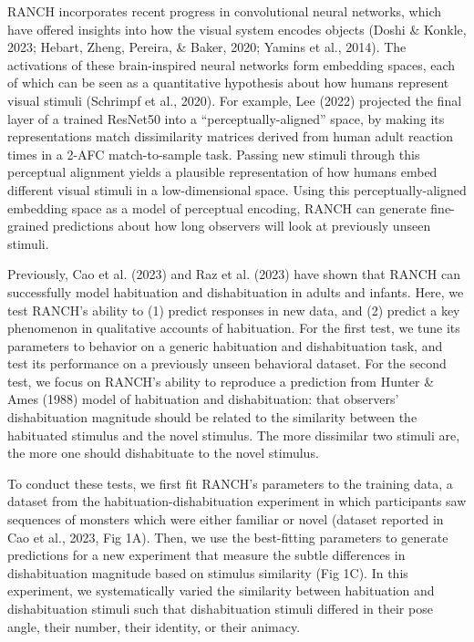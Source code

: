 \documentclass[10pt, letterpaper]{article}
\begin{document}
RANCH incorporates recent progress in convolutional neural networks,
which have offered insights into how the visual system encodes objects
(Doshi \& Konkle, 2023; Hebart, Zheng, Pereira, \& Baker, 2020; Yamins
et al., 2014). The activations of these brain-inspired neural networks
form embedding spaces, each of which can be seen as a quantitative
hypothesis about how humans represent visual stimuli (Schrimpf et al.,
2020). For example, Lee (2022) projected the final layer of a trained
ResNet50 into a ``perceptually-aligned'' space, by making its
representations match dissimilarity matrices derived from human adult
reaction times in a 2-AFC match-to-sample task. Passing new stimuli
through this perceptual alignment yields a plausible representation of
how humans embed different visual stimuli in a low-dimensional space.
Using this perceptually-aligned embedding space as a model of perceptual
encoding, RANCH can generate fine-grained predictions about how long
observers will look at previously unseen stimuli.

Previously, Cao et al. (2023) and Raz et al. (2023) have shown that
RANCH can successfully model habituation and dishabituation in adults
and infants. Here, we test RANCH's ability to (1) predict responses in
new data, and (2) predict a key phenomenon in qualitative accounts of
habituation. For the first test, we tune its parameters to behavior on a
generic habituation and dishabituation task, and test its performance on
a previously unseen behavioral dataset. For the second test, we focus on
RANCH's ability to reproduce a prediction from Hunter \& Ames (1988)
model of habituation and dishabituation: that observers' dishabituation
magnitude should be related to the similarity between the habituated
stimulus and the novel stimulus. The more dissimilar two stimuli are,
the more one should dishabituate to the novel stimulus.

To conduct these tests, we first fit RANCH's parameters to the training
data, a dataset from the habituation-dishabituation experiment in which
participants saw sequences of monsters which were either familiar or
novel (dataset reported in Cao et al., 2023, Fig 1A). Then, we use the
best-fitting parameters to generate predictions for a new experiment
that measure the subtle differences in dishabituation magnitude based on
stimulus similarity (Fig 1C). In this experiment, we systematically
varied the similarity between habituation and dishabituation stimuli
such that dishabituation stimuli differed in their pose angle, their
number, their identity, or their animacy.
\end{document}
